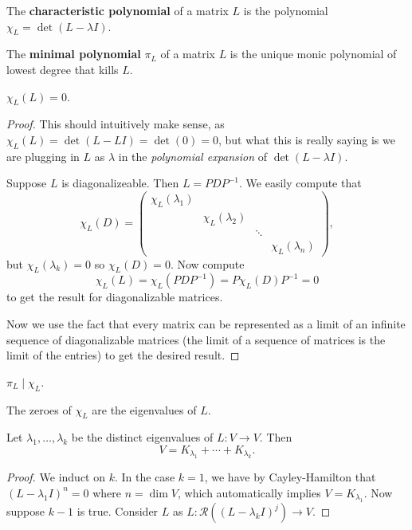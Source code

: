 \begin{df}
The \textbf{characteristic polynomial} of a matrix $L$ is the polynomial
$\chi_L = \det(L - \lambda I)$.
\end{df}

\begin{df}
The \textbf{minimal polynomial} $\pi_L$ of a matrix $L$ is the unique
monic polynomial of lowest degree that kills $L$.
\end{df}

\begin{thm}
$\chi_L(L) = 0$.
\end{thm}

\begin{proof}
This should intuitively make sense, as $\chi_L(L) = \det(L - LI) =
\det(0) = 0$, but what this is really saying is we are plugging in $L$
as $\lambda$ in the \emph{polynomial expansion} of $\det(L - \lambda
I)$.

Suppose $L$ is diagonalizeable. Then $L = PDP^{-1}$. We easily compute
that
\[ \chi_L(D) = \begin{pmatrix}
\chi_L(\lambda_1) & & \\
& \chi_L(\lambda_2) & & \\
& & \ddots & \\
& & & \chi_L(\lambda_n)
\end{pmatrix}, \]
but $\chi_L(\lambda_k) = 0$ so $\chi_L(D) = 0$. Now compute
\[ \chi_L(L) = \chi_L(PDP^{-1}) = P\chi_L(D)P^{-1} = 0 \]
to get the result for diagonalizable matrices.

Now we use the fact that every matrix can be represented as a limit of
an infinite sequence of diagonalizable matrices (the limit of a sequence
of matrices is the limit of the entries) to get the desired result.
\end{proof}

\begin{cor}
$\pi_L \mid \chi_L$.
\end{cor}

\begin{prop}
The zeroes of $\chi_L$ are the eigenvalues of $L$.
\end{prop}

\begin{lem}
Let $\lambda_1, \dots, \lambda_k$ be the distinct eigenvalues of $L : V
\rightarrow V$. Then
\[ V = K_{\lambda_1} + \cdots + K_{\lambda_k}. \]
\end{lem}

\begin{proof}
We induct on $k$. In the case $k = 1$, we have by Cayley-Hamilton that
$(L - \lambda_1 I)^n = 0$ where $n = \dim V$, which automatically
implies $V = K_{\lambda_1}$. Now suppose $k - 1$ is true. Consider $L$
as $L : \mathcal{R}((L - \lambda_k I)^j) \rightarrow V$.
\end{proof}

